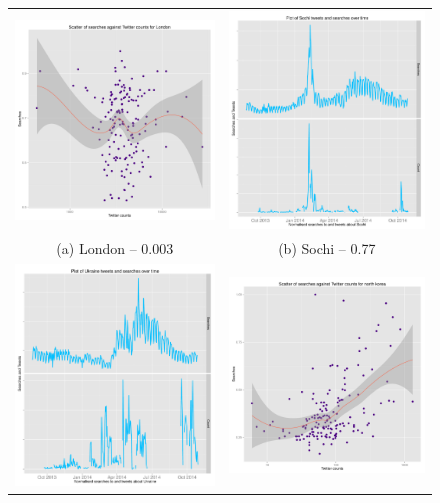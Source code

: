 \documentclass[minf,frontabs,twoside,singlespacing,parskip]{infthesis}
\begin{document}
\begin{figure}[p!]
\begin{tabular}{cc}
  \includegraphics[width=65mm]{London} &   \includegraphics[width=65mm]{Sochi} \\
(a) London -- 0.003 & (b) Sochi -- 0.77 \\[6pt]
 \includegraphics[width=65mm]{Ukraine} &   \includegraphics[width=65mm]{north-korea} \\

\end{tabular}
\end{figure}
\end{document}
